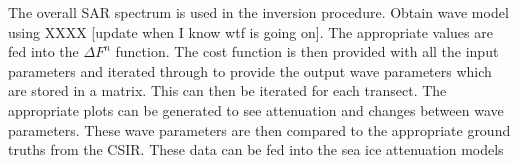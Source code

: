 The overall SAR spectrum is used in the inversion procedure. Obtain wave model using XXXX [update when I know wtf is going on]. The appropriate values are fed into the $\Delta F^n$ function. The cost function is then provided with all the input parameters and iterated through to provide the output wave parameters which are stored in a matrix. This can then be iterated for each transect. The appropriate plots can be generated to see attenuation and changes between wave parameters. These wave parameters are then compared to the appropriate ground truths from the CSIR. These data can be fed into the sea ice attenuation models 





